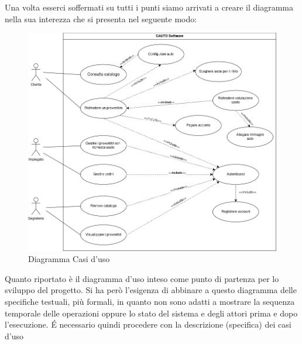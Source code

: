 \documentclass[a4paper, 11pt,oneside]{book}
\newcommand{\spacing}{\par\bigskip\noindent}
\begin{document}
        Una volta esserci soffermati su tutti i punti siamo arrivati a creare il diagramma nella sua interezza che si presenta nel seguente modo:
        \begin{figure}[H]
            \includegraphics[width=\textwidth]{Diagramma_casi_d'uso.png}
            \caption{Diagramma Casi d'uso}
            \label{fig:diagramma_casi_d'uso}
        \end{figure}
        \spacing
        Quanto riportato è il diagramma d'uso inteso come punto di partenza per lo sviluppo del progetto. Si ha però l'esigenza di abbinare a questo
        diagramma delle specifiche testuali, più formali, in quanto non sono adatti a mostrare la sequenza temporale delle operazioni oppure lo stato del
        sistema e degli attori prima e dopo l'esecuzione. \'E necessario quindi procedere con la descrizione (specifica) dei casi d'uso
\end{document}
